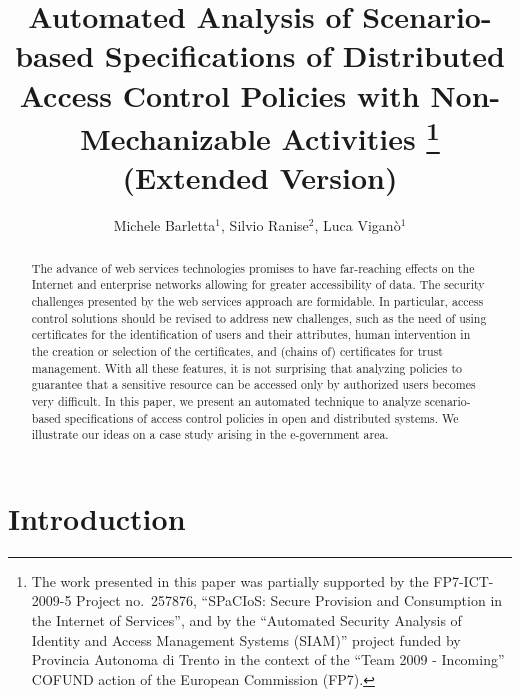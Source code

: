 \documentclass[conference]{llncs}
\begin{document}
\title{
Automated Analysis of Scenario-based Specifications of Distributed
Access Control Policies with Non-Mechanizable Activities \thanks{The work presented in this paper was partially supported by the FP7-ICT-2009-5 Project no.~257876,
 ``SPaCIoS: Secure Provision and Consumption in the Internet of
 Services'', and by the ``Automated Security Analysis of Identity and
 Access Management Systems (SIAM)'' project funded by Provincia
 Autonoma di Trento in the context of the ``Team 2009 - Incoming''
 COFUND action of the European Commission (FP7).}
\\
(Extended Version)} 

\author{Michele Barletta$^1$, Silvio Ranise$^2$, Luca Vigan\`o$^1$} 


\maketitle



\begin{abstract}
  The advance of web services technologies promises to have
  far-reaching effects on the Internet and enterprise networks
  allowing for greater accessibility of data.  The security challenges
  presented by the web services approach are formidable.  In
  particular, access control solutions should be revised to address
  new challenges, such as the need of using certificates for the
  identification of users and their attributes, human intervention in
  the creation or selection of the certificates, and (chains of)
  certificates for trust management.  With all these features, it is
  not surprising that analyzing policies to guarantee that a sensitive
  resource can be accessed only by authorized users becomes very
  difficult.  In this paper, we present an automated technique to
  analyze scenario-based specifications of access control policies in
  open and distributed systems.  We illustrate our ideas on a case
  study arising in the e-government area.
\end{abstract}

\section{Introduction}
\end{document}
